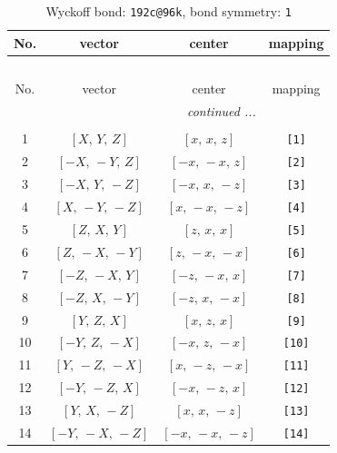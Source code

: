 \documentclass[fleqn,8pt]{jsarticle}
\begin{document}
\begin{longtable}{cccc}
\caption{Wyckoff bond: {\tt 192c@96k}, bond symmetry: {\tt 1}}
 \\
 \hline \hline
No. & vector & center & mapping \\ \hline \endfirsthead

\multicolumn{3}{l}{\tablename\ \thetable{}} \\
 \hline \hline
No. & vector & center & mapping \\ \hline \endhead

 \hline \hline
\multicolumn{3}{r}{\footnotesize\it continued ...} \\ \endfoot

 \hline \hline
\multicolumn{3}{r}{} \\ \endlastfoot

1 & $\left[ X,\, Y,\, Z \right]$ & $\left[ x,\, x,\, z \right]$ & {\tt [1]} \\ \hline
2 & $\left[ - X,\, - Y,\, Z \right]$ & $\left[ - x,\, - x,\, z \right]$ & {\tt [2]} \\ \hline
3 & $\left[ - X,\, Y,\, - Z \right]$ & $\left[ - x,\, x,\, - z \right]$ & {\tt [3]} \\ \hline
4 & $\left[ X,\, - Y,\, - Z \right]$ & $\left[ x,\, - x,\, - z \right]$ & {\tt [4]} \\ \hline
5 & $\left[ Z,\, X,\, Y \right]$ & $\left[ z,\, x,\, x \right]$ & {\tt [5]} \\ \hline
6 & $\left[ Z,\, - X,\, - Y \right]$ & $\left[ z,\, - x,\, - x \right]$ & {\tt [6]} \\ \hline
7 & $\left[ - Z,\, - X,\, Y \right]$ & $\left[ - z,\, - x,\, x \right]$ & {\tt [7]} \\ \hline
8 & $\left[ - Z,\, X,\, - Y \right]$ & $\left[ - z,\, x,\, - x \right]$ & {\tt [8]} \\ \hline
9 & $\left[ Y,\, Z,\, X \right]$ & $\left[ x,\, z,\, x \right]$ & {\tt [9]} \\ \hline
10 & $\left[ - Y,\, Z,\, - X \right]$ & $\left[ - x,\, z,\, - x \right]$ & {\tt [10]} \\ \hline
11 & $\left[ Y,\, - Z,\, - X \right]$ & $\left[ x,\, - z,\, - x \right]$ & {\tt [11]} \\ \hline
12 & $\left[ - Y,\, - Z,\, X \right]$ & $\left[ - x,\, - z,\, x \right]$ & {\tt [12]} \\ \hline
13 & $\left[ Y,\, X,\, - Z \right]$ & $\left[ x,\, x,\, - z \right]$ & {\tt [13]} \\ \hline
14 & $\left[ - Y,\, - X,\, - Z \right]$ & $\left[ - x,\, - x,\, - z \right]$ & {\tt [14]} \\ \hline

\end{longtable}
\end{document}
